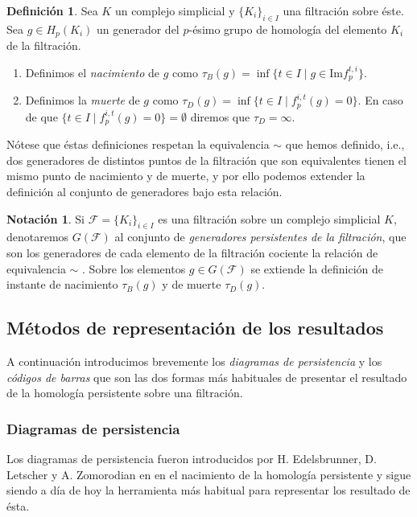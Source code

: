\documentclass[12pt,a4paper,twoside]{article} %
\theoremstyle{plain}
\theoremstyle{definition}
\newtheorem{definicion}{Definición}[subsection]
\newtheorem*{notacion}{Notación}
\newcommand{\tq}{\; | \;}
\newcommand{\Img}[1]{\mathrm{Im}#1}
\begin{document}
\begin{definicion}
Sea $K$ un complejo simplicial y $\{K_i\}_{i\in I}$ una filtración sobre éste. Sea $g\in H_p(K_i)$ un generador del $p$-ésimo grupo de homología del elemento $K_i$ de la filtración.
\begin{enumerate}
\item Definimos el \emph{nacimiento} de $g$ como $\tau_B (g) = \inf \{ t\in I \tq g \in \Img{f_p^{t,i}} \}$.
\item Definimos la \emph{muerte} de $g$ como $\tau_D (g) = \inf \{ t\in I \tq f_p^{i,t} (g) = 0 \}$. En caso de que $\{ t\in I \tq f_p^{i,t} (g) = 0 \} = \emptyset $ diremos que $\tau_D = \infty$.
\end{enumerate}
\end{definicion}

Nótese que éstas definiciones respetan la equivalencia $\sim$ que hemos definido, i.e., dos generadores de distintos puntos de la filtración que son equivalentes tienen el mismo punto de nacimiento y de muerte, y por ello podemos extender la definición al conjunto de generadores bajo esta relación.

\begin{notacion}
Si $\mathcal{F}=\{K_i\}_{i \in I}$ es una filtración sobre un complejo simplicial $K$, denotaremos $G(\mathcal{F})$ al conjunto de \emph{generadores persistentes de la filtración}, que son los generadores de cada elemento de la filtración cociente la relación de equivalencia $\sim$ . Sobre los elementos $g \in G(\mathcal{F})$ se extiende la definición de instante de nacimiento $\tau_B(g)$ y de muerte $\tau_D(g)$.
\end{notacion}

\subsection{Métodos de representación de los resultados}

A continuación introducimos brevemente los \emph{diagramas de persistencia} y los \emph{códigos de barras} que son las dos formas más habituales de presentar el resultado de la homología persistente sobre una filtración.

\subsubsection{Diagramas de persistencia}
Los diagramas de persistencia fueron introducidos por H. Edelsbrunner, D. Letscher y A. Zomorodian en \cite{Edelsbrunner} en el nacimiento de la homología persistente y sigue siendo a día de hoy la herramienta más habitual para representar los resultado de ésta.
\end{document}
